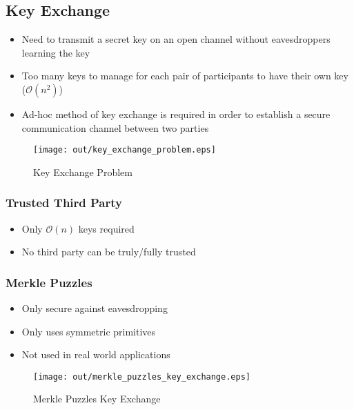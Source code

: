\documentclass[a4paper]{article}
\begin{document}
\subsection{Key Exchange}

\begin{itemize}
  \item Need to transmit a secret key on an open channel without eavesdroppers
        learning the key
  \item Too many keys to manage for each pair of participants to have their own
        key ($\mathcal{O}(n^{2})$)
  \item Ad-hoc method of key exchange is required in order to establish a secure
        communication channel between two parties
\end{itemize}

\begin{figure}[h!]
  \centering
  \texttt{[image: out/key\_exchange\_problem.eps]}
  \caption{Key Exchange Problem}
  \label{fig:key_exchange_problem}
\end{figure}
\FloatBarrier

\subsubsection{Trusted Third Party}

\begin{itemize}
  \item Only $\mathcal{O}(n)$ keys required
  \item No third party can be truly/fully trusted
\end{itemize}

\subsubsection{Merkle Puzzles}

\begin{itemize}
  \item Only secure against eavesdropping
  \item Only uses symmetric primitives
  \item Not used in real world applications
\end{itemize}

\begin{figure}[h!]
  \centering
  \texttt{[image: out/merkle\_puzzles\_key\_exchange.eps]}
  \caption{Merkle Puzzles Key Exchange}
  \label{fig:merkle_puzzles_key_exchange}
\end{figure}
\FloatBarrier
\end{document}
